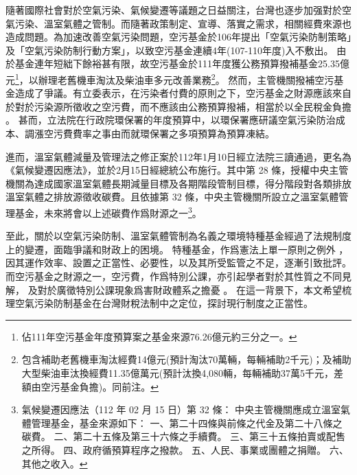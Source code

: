\documentclass[12pt,a4paper]{article}
\begin{document}
隨著國際社會對於空氣污染、氣候變遷等議題之日益關注，台灣也逐步加强對於空氣污染、溫室氣體之管制。而隨著政策制定、宣導、落實之需求，相關經費來源也造成問題。為加速改善空氣污染問題，空污基金於106年提出「空氣污染防制策略」及「空氣污染防制行動方案」，以致空污基金連續4年(107-110年度)入不敷出。
由於基金連年短絀下餘裕甚有限，故空污基金於111年度獲公務預算撥補基金25.35億元\footnote{佔111年空污基金年度預算案之基金來源76.26億元約三分之一。}，以辦理老舊機車淘汰及柴油車多元改善業務\footnote{包含補助老舊機車淘汰經費14億元(預計淘汰70萬輛，每輛補助2千元)；及補助大型柴油車汰換經費11.35億萬元(預計汰換4,080輛，每輛補助37萬5千元，差額由空污基金負擔)。同前注。}。
然而，主管機關撥補空污基金造成了爭議。有立委表示，在污染者付費的原則之下，空污基金之財源應該來自於對於污染源所徵收之空污費，而不應該由公務預算撥補，相當於以全民稅金負擔
。
甚而，立法院在行政院環保署的年度預算中，以環保署應研議空氣污染防治成本、調漲空污費費率之事由而就環保署之多項預算為預算凍結。

進而，溫室氣體減量及管理法之修正案於112年1月10日經立法院三讀通過，更名為《氣候變遷因應法》，並於2月15日經總統公布施行。其中第 28 條，授權中央主管機關為達成國家溫室氣體長期減量目標及各期階段管制目標，得分階段對各類排放溫室氣體之排放源徵收碳費。且依據第 32 條，中央主管機關所設立之溫室氣體管理基金，未來將會以上述碳費作爲財源之一\footnote{氣候變遷因應法（112 年 02 月 15 日）第 32 條：
中央主管機關應成立溫室氣體管理基金，基金來源如下：
一、第二十四條與前條之代金及第二十八條之碳費。
二、第二十五條及第三十六條之手續費。
三、第三十五條拍賣或配售之所得。
四、政府循預算程序之撥款。
五、人民、事業或團體之捐贈。
六、其他之收入。}。




至此，關於以空氣污染防制、溫室氣體管制為名義之環境特種基金經過了法規制度上的變遷，面臨爭議和財政上的困境。
特種基金，作爲憲法上單一原則之例外
，因其運作效率、設置之正當性、必要性，以及其所受監管之不足，逐漸引致批評。而空污基金之財源之一，空污費，作爲特別公課，亦引起學者對於其性質之不同見解，
及對於廣徵特別公課現象爲害財政體系之擔憂
。
在這一背景下，本文希望梳理空氣污染防制基金在台灣財稅法制中之定位，探討現行制度之正當性。
\end{document}
